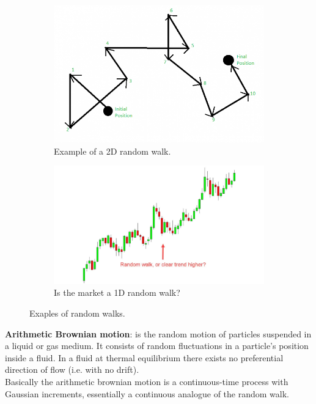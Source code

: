 \begin{figure}[H]
    \centering
    \begin{subfigure}{0.47\textwidth}
        \centering
        \includegraphics[width=\linewidth]{img/random_walk_1.png}
        \caption{Example of a 2D random walk.}
        \label{fig:sub1}
    \end{subfigure}
    \hfill
    \begin{subfigure}{0.47\textwidth}
        \centering
        \includegraphics[width=\linewidth]{img/random_walk_2.png}
        \caption{Is the market a 1D random walk?}
        \label{fig:sub2}
    \end{subfigure}
    \caption{Exaples of random walks.}
    \label{fig:due_immagini}
\end{figure}

\textbf{Arithmetic Brownian motion}: is the random motion of particles suspended in a liquid or gas medium. It consists of random fluctuations in a particle's position inside a fluid. In a fluid at thermal equilibrium there exists no preferential direction of flow (i.e. with no drift). \\
Basically the arithmetic brownian motion is a continuous-time process with Gaussian increments, essentially a continuous analogue of the random walk.\\

